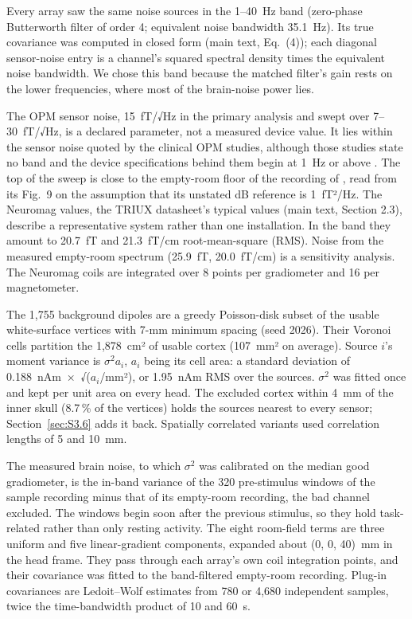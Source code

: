 \documentclass[preprint,12pt,authoryear,a4paper]{elsarticle}
\begin{document}
Every array saw the same noise sources in the 1–40~Hz band (zero-phase Butterworth filter of order 4; equivalent noise bandwidth 35.1~Hz). Its true covariance was computed in closed form (main text, Eq.~(4)); each diagonal sensor-noise entry is a channel's squared spectral density times the equivalent noise bandwidth. We chose this band because the matched filter's gain rests on the lower frequencies, where most of the brain-noise power lies.

The OPM sensor noise, 15~fT/√Hz in the primary analysis and swept over 7–30~fT/√Hz, is a declared parameter, not a measured device value. It lies within the sensor noise quoted by the clinical OPM studies, although those studies state no band and the device specifications behind them begin at 1~Hz or above \citep{osborne2018}. The top of the sweep is close to the empty-room floor of the recording of \citet{jas2026}, read from its Fig.~9 on the assumption that its unstated dB reference is 1~fT²/Hz. The Neuromag values, the TRIUX datasheet's typical values (main text, Section 2.3), describe a representative system rather than one installation. In the band they amount to 20.7~fT and 21.3~fT/cm root-mean-square (RMS). Noise from the measured empty-room spectrum (25.9~fT, 20.0~fT/cm) is a sensitivity analysis. The Neuromag coils are integrated over 8 points per gradiometer and 16 per magnetometer.

The 1,755 background dipoles are a greedy Poisson-disk subset of the usable white-surface vertices with 7-mm minimum spacing (seed 2026). Their Voronoi cells partition the 1,878~cm² of usable cortex (107~mm² on average). Source $i$'s moment variance is $\sigma^{2} a_i$, $a_i$ being its cell area: a standard deviation of 0.188~nAm~×~√($a_i$/mm²), or 1.95~nAm RMS over the sources. $\sigma^{2}$ was fitted once and kept per unit area on every head. The excluded cortex within 4~mm of the inner skull (8.7\,\% of the vertices) holds the sources nearest to every sensor; Section~\ref{sec:S3.6} adds it back. Spatially correlated variants used correlation lengths of 5 and 10~mm.

The measured brain noise, to which $\sigma^{2}$ was calibrated on the median good gradiometer, is the in-band variance of the 320 pre-stimulus windows of the sample recording minus that of its empty-room recording, the bad channel excluded. The windows begin soon after the previous stimulus, so they hold task-related rather than only resting activity. The eight room-field terms are three uniform and five linear-gradient components, expanded about (0, 0, 40)~mm in the head frame. They pass through each array's own coil integration points, and their covariance was fitted to the band-filtered empty-room recording. Plug-in covariances are Ledoit--Wolf estimates from 780 or 4,680 independent samples, twice the time-bandwidth product of 10 and 60~s.
\end{document}
